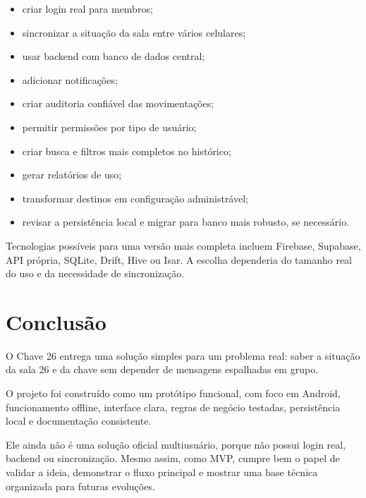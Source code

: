 \documentclass[12pt,a4paper]{article}
\begin{document}
\begin{itemize}
    \item criar login real para membros;
    \item sincronizar a situação da sala entre vários celulares;
    \item usar backend com banco de dados central;
    \item adicionar notificações;
    \item criar auditoria confiável das movimentações;
    \item permitir permissões por tipo de usuário;
    \item criar busca e filtros mais completos no histórico;
    \item gerar relatórios de uso;
    \item transformar destinos em configuração administrável;
    \item revisar a persistência local e migrar para banco mais robusto, se necessário.
\end{itemize}

Tecnologias possíveis para uma versão mais completa incluem Firebase, Supabase, API própria, SQLite, Drift, Hive ou Isar. A escolha dependeria do tamanho real do uso e da necessidade de sincronização.

\section{Conclusão}

O Chave 26 entrega uma solução simples para um problema real: saber a situação da sala 26 e da chave sem depender de mensagens espalhadas em grupo.

O projeto foi construído como um protótipo funcional, com foco em Android, funcionamento offline, interface clara, regras de negócio testadas, persistência local e documentação consistente.

Ele ainda não é uma solução oficial multiusuário, porque não possui login real, backend ou sincronização. Mesmo assim, como MVP, cumpre bem o papel de validar a ideia, demonstrar o fluxo principal e mostrar uma base técnica organizada para futuras evoluções.
\end{document}
